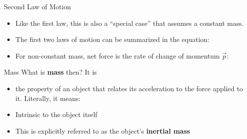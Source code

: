 \documentclass[12pt,compress,aspectratio=169]{beamer}
\begin{document}
\begin{frame}{Second Law of Motion}
  \begin{center}
  \end{center}
  \begin{itemize}
  \item\textcolor{red!80!black}{Like the first law, this is also a
    ``special case'' that assumes a constant mass.}
  \item The first two laws of motion can be summarized in the equation:

  \item For non-constant mass, net force is the rate of change of momentum
    $\vec p$:

  \end{itemize}
\end{frame}



\begin{frame}{Mass}
  What is \textbf{mass} then? It is
  \begin{itemize}
  \item the property of an object that relates its acceleration to the force
    applied to it. Literally, it means:

  \item Intrinsic to the object itself
  \item This is explicitly referred to as the object's \textbf{inertial mass}
  \end{itemize}
\end{frame}
\end{document}
